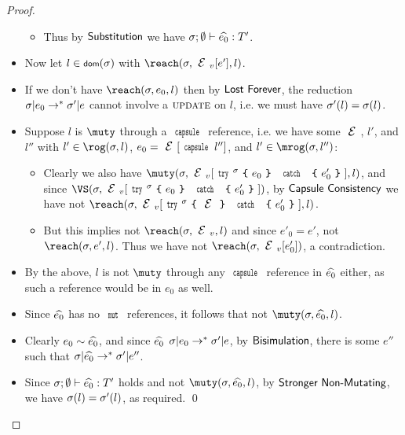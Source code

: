 \begin{proof}
\begin{itemize}
\begin{itemize}
			\item Thus by $\textsf{Substitution}$ we have $\tyr{\demut{e_0}}{T'}$.
		\end{itemize}
		\item Now let $l\in\dom(\s)$ with $\reach(\s,\EV[e'],l)$.
		\item If we don't have $\reach(\s,e_0,l)$ then by $\textsf{Lost Forever}$,
		the reduction $\sigma|e_0\rightarrow^*\sigma'|e$ cannot involve a $\textsc{update}$
		on $l$, i.e. we must have $\sigma'(l) = \sigma(l)$.
		\item Suppose $l$ is $\muty$ through a $\Kw{capsule}$ reference, i.e. we have
		some $\E$, $l'$, and $l''$ with $l'\in\rog(\s,l)$, $e_0 = \E[\Kw{capsule}\,l'']$,
		and $l'\in\mrog(\s,l'')$:
		\begin{itemize}
			\item Clearly we also have $\muty(\s,\EV[\trys{\s}{e_0}{e'_0}],l)$,
			and since $\VS(\s,\EV[\trys{\s}{e_0}{e'_0}])$, by $\textsf{Capsule Consistency}$
			we have not $\reach(\s,\EV[\trys{\s}{\E}{e'_0}],l)$.
			\item But this implies not $\reach(\s,\EV,l)$ and since $e'_0 = e'$,
			not $\reach(\s,e',l)$. Thus we have not $\reach(\s,\EV[e'_0])$,
			a contradiction.
		\end{itemize}
		\item By the above, $l$ is not $\muty$ through any $\Kw{capsule}$ reference
		in $\widehat{e_0}$ either, as such a reference would be in $e_0$
		as well.
		\item Since $\widehat{e_0}$ has no $\Kw{mut}$ references, it follows that
		not $\muty(\s,\demut{e_0},l)$.
		\item Clearly $e_0\sim\widehat{e_0}$, and since $\widehat{e_0}$ $\sigma|e_0\rightarrow^*\sigma'|e$,
		by $\textsf{Bisimulation}$, there is some $e''$ such that $\sigma|\widehat{e_0}\rightarrow^*\sigma'|e''$.
		\item Since $\tyr{\demut{e_0}}{T'}$ holds and not $\muty(\s,\demut{e_0},l)$,
		by $\textsf{Stronger Non-Mutating}$, we have $\sigma(l) = \sigma'(l)$, as
		required.
	\qed\end{itemize}
\end{proof}

\lstset{language=FortyThree} %